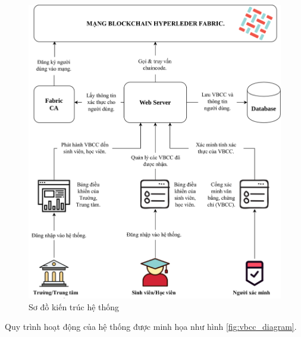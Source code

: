 \begin{figure}[htbp]
\centering
\includegraphics[width=.9\linewidth]{img/vbcc_phanmem.jpg}
\caption{Sơ đồ kiến trúc hệ thống}
\label{fig:vbcc_phanmem}
\end{figure}

Quy trình hoạt động của hệ thống được minh họa như hình \ref{fig:vbcc_diagram}.

